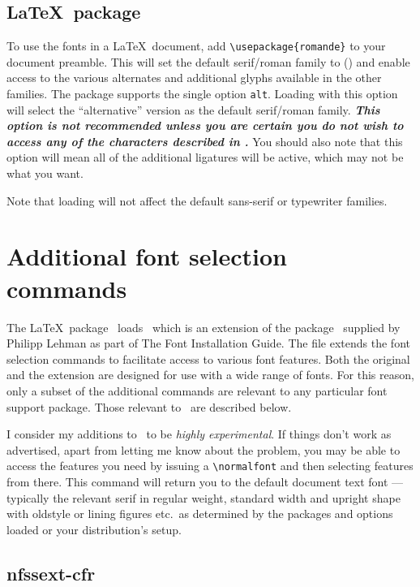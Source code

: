 \documentclass[11pt,british]{article}
\begin{document}
\subsection{\LaTeX\ package}

To use the fonts in a \LaTeX\ document, add \verb|\usepackage{romande}| to your document preamble. This will set the default serif/roman family to  () and enable access to the various alternates and additional glyphs available in the other families. The package supports the single option \verb|alt|. Loading  with this option will select the ``alternative'' version as the default serif/roman family. \textbf{\emph{This option is not recommended unless you are \emph{certain} you do not wish to access any of the characters described in .}} You should also note that this option will mean all of the additional ligatures will be active, which may not be what you want.

Note that loading  will not affect the default sans-serif or typewriter families.
	
\section{Additional font selection commands}\label{sec:commands}

	The \LaTeX\ package \ loads \ which is an extension of the package \ supplied by Philipp Lehman as part of The Font Installation Guide. The file extends the font selection commands to facilitate access to various font features. Both the original and the extension are designed for use with a wide range of fonts. For this reason, only a subset of the additional commands are relevant to any particular font support package. Those relevant to \ are described below.
	
	I consider my additions to \ to be \emph{highly experimental}. If things don't work as advertised, apart from letting me know about the problem, you may be able to access the features you need by issuing a \verb|\normalfont| and then selecting features from there. This command will return you to the default document text font --- typically the relevant serif in regular weight, standard width and upright shape with oldstyle or lining figures etc.\ as determined by the packages and options loaded or your distribution's setup.
	
\subsection{nfssext-cfr}
\end{document}
